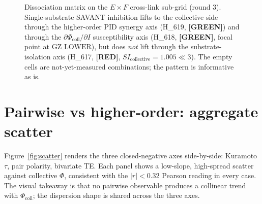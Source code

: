 \documentclass[11pt,a4paper]{article}
\providecommand{\tierGreen}{\textbf{[GREEN]}}
\providecommand{\tierRed}{\textbf{[RED]}}
\begin{document}
\begin{figure}[h]
\centering
{}
\caption{Dissociation matrix on the $E \times F$ cross-link sub-grid
(round 3). Single-substrate SAVANT inhibition lifts to the collective
side through the higher-order PID synergy axis (H\_619, \tierGreen)
and through the $\partial \Phi_{\mathrm{coll}}/\partial I$
susceptibility axis (H\_618, \tierGreen, focal point at $\mathrm{GZ\_LOWER}$),
but does \emph{not} lift through the substrate-isolation axis
(H\_617, \tierRed, $SI_{\mathrm{collective}} = 1.005 \ll 3$). The
empty cells are not-yet-measured combinations; the pattern is
informative as is.}
\label{fig:dissoc}
\end{figure}

\section{Pairwise vs higher-order: aggregate scatter}
\label{sec:scatter}

Figure~\ref{fig:scatter} renders the three closed-negative axes
side-by-side: Kuramoto $\tau$, pair polarity, bivariate TE. Each
panel shows a low-slope, high-spread scatter against collective
$\Phi$, consistent with the $|r| < 0.32$ Pearson reading in every
case. The visual takeaway is that no pairwise observable produces a
collinear trend with $\Phi_{\mathrm{coll}}$; the dispersion shape is
shared across the three axes.
\end{document}
